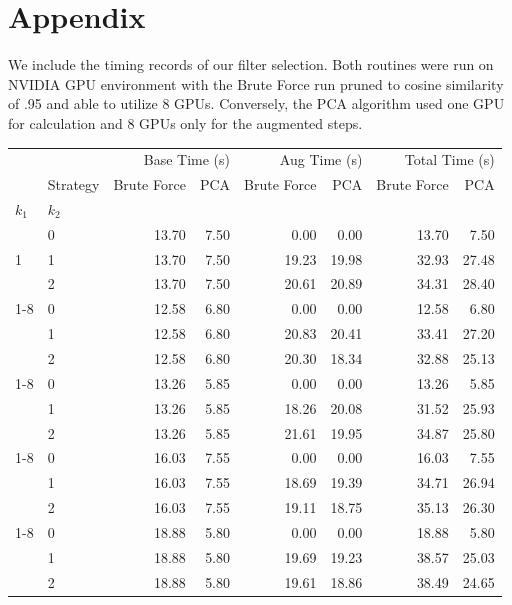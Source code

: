 
\section{Appendix}

We include the timing records of our filter selection. 
Both routines were run on NVIDIA GPU environment with the Brute Force run pruned to cosine similarity of .95 and able to utilize 8 GPUs. 
Conversely, the PCA algorithm used one GPU for calculation and 8 GPUs only for the augmented steps. 

\begin{table}[htbp]
    \begin{tabular}{llrrrrrr}
    \toprule
    &  & \multicolumn{2}{r}{Base Time (s)} & \multicolumn{2}{r}{Aug Time (s)} & \multicolumn{2}{r}{Total Time (s)} \\
    & Strategy & Brute Force & PCA & Brute Force & PCA & Brute Force & PCA \\
    $k_1$ & $k_2$ &  &  &  &  &  &  \\
    \midrule
    \multirow[t]{3}{*}{1} & 0 & 13.70 & 7.50 & 0.00 & 0.00 & 13.70 & 7.50 \\
    & 1 & 13.70 & 7.50 & 19.23 & 19.98 & 32.93 & 27.48 \\
    & 2 & 13.70 & 7.50 & 20.61 & 20.89 & 34.31 & 28.40 \\
    \cline{1-8}
    \multirow[t]{3}{*}{2} & 0 & 12.58 & 6.80 & 0.00 & 0.00 & 12.58 & 6.80 \\
    & 1 & 12.58 & 6.80 & 20.83 & 20.41 & 33.41 & 27.20 \\
    & 2 & 12.58 & 6.80 & 20.30 & 18.34 & 32.88 & 25.13 \\
    \cline{1-8}
    \multirow[t]{3}{*}{3} & 0 & 13.26 & 5.85 & 0.00 & 0.00 & 13.26 & 5.85 \\
    & 1 & 13.26 & 5.85 & 18.26 & 20.08 & 31.52 & 25.93 \\
    & 2 & 13.26 & 5.85 & 21.61 & 19.95 & 34.87 & 25.80 \\
    \cline{1-8}
    \multirow[t]{3}{*}{4} & 0 & 16.03 & 7.55 & 0.00 & 0.00 & 16.03 & 7.55 \\
    & 1 & 16.03 & 7.55 & 18.69 & 19.39 & 34.71 & 26.94 \\
    & 2 & 16.03 & 7.55 & 19.11 & 18.75 & 35.13 & 26.30 \\
    \cline{1-8}
    \multirow[t]{3}{*}{5} & 0 & 18.88 & 5.80 & 0.00 & 0.00 & 18.88 & 5.80 \\
    & 1 & 18.88 & 5.80 & 19.69 & 19.23 & 38.57 & 25.03 \\
    & 2 & 18.88 & 5.80 & 19.61 & 18.86 & 38.49 & 24.65 \\

\end{tabular}
\end{table}
